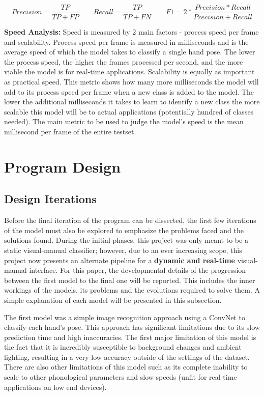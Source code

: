 \documentclass[11pt]{article}
\begin{document}
        \vskip 0.3cm
        \[Precision = \frac{TP}{TP+FP} \qquad{}
        Recall = \frac{TP}{TP+FN} \qquad{}
        F1 = 2*\frac{Precision * Recall}{Precision + Recall}\]
        \vskip 0.3cm
        

        \noindent\textbf{Speed Analysis: } Speed is measured by 2 main factors - process speed per frame and scalability. Process speed per frame is measured in milliseconds and is the average speed of which the model takes to classify a single hand pose. The lower the process speed, the higher the frames processed per second, and the more viable the model is for real-time applications. Scalability is equally as important as practical speed. This metric shows how many more milliseconds the model will add to its process speed per frame when a new class is added to the model. The lower the additional milliseconds it takes to learn to identify a new class the more scalable this model will be to actual applications (potentially hundred of classes needed). The main metric to be used to judge the model's speed is the mean millisecond per frame of the entire testset.

\section{Program Design}
    \subsection{Design Iterations}
        Before the final iteration of the program can be dissected, the first few iterations of the model must also be explored to emphasize the problems faced and the solutions found. During the initial phases, this project was only meant to be a static visual-manual classifier; however, due to an ever increasing scope, this project now presents an alternate pipeline for a \textbf{dynamic and real-time} visual-manual interface. For this paper, the developmental details of the progression between the first model to the final one will be reported. This includes the inner workings of the models, its problems and the evolutions required to solve them. A simple explanation of each model will be presented in this subsection.

        The first model was a simple image recognition approach using a ConvNet to classify each hand's pose. This approach has significant limitations due to its slow prediction time and high inaccuracies. The first major limitation of this model is the fact that it is incredibly susceptible to background changes and ambient lighting, resulting in a very low accuracy outside of the settings of the dataset. There are also other limitations of this model such as its complete inability to scale to other phonological parameters and slow speeds (unfit for real-time applications on low end devices).
\end{document}
